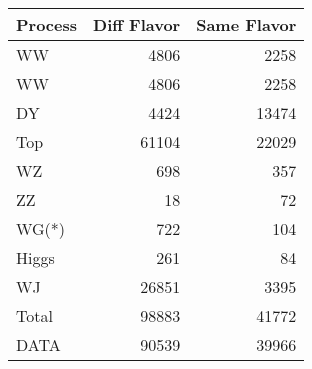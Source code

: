 \begin{table}[ht]
	\centering
\begin{tabular}{lrr}

Process &  Diff Flavor &  Same Flavor \\
		\hline
     WW &         4806 &         2258 \\
     WW &         4806 &         2258 \\
     DY &         4424 &        13474 \\
    Top &        61104 &        22029 \\
     WZ &          698 &          357 \\
     ZZ &           18 &           72 \\
  WG(*) &          722 &          104 \\
  Higgs &          261 &           84 \\
     WJ &        26851 &         3395 \\
\hline
  Total &        98883 &        41772 \\
   DATA &        90539 &        39966 \\


\end{tabular}

\end{table}
